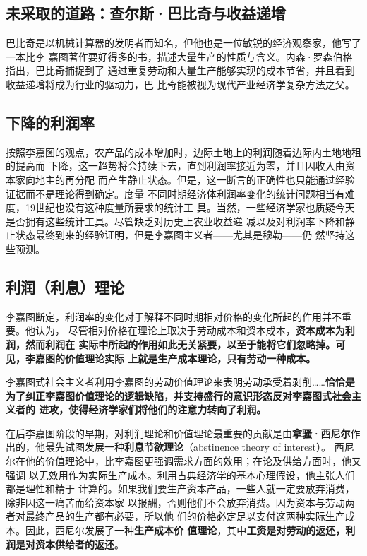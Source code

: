 \subsection{未采取的道路：查尔斯·巴比奇与收益递增}

巴比奇是以机械计算器的发明者而知名，但他也是一位敏锐的经济观察家，他写了一本比李
嘉图著作要好得多的书，描述大量生产的性质与含义。内森·罗森伯格指出，巴比奇捕捉到了
通过重复劳动和大量生产能够实现的成本节省，并且看到收益递增将成为行业的驱动力，巴
比奇能被视为现代产业经济学复杂方法之父。

\subsection{下降的利润率}

按照李嘉图的观点，农产品的成本增加时，边际土地上的利润随着边际内土地地租的提高而
下降，这一趋势将会持续下去，直到利润率接近为零，并且因收入由资本家向地主的再分配
而产生静止状态。但是，这一断言的正确性也只能通过经验证据而不是理论得到确定。度量
不同时期经济体利润率变化的统计问题相当有难度，19世纪也没有这种度量所要求的统计工
具。当然，一些经济学家也质疑今天是否拥有这些统计工具。尽管缺乏对历史上农业收益递
减以及对利润率下降和静止状态最终到来的经验证明，但是李嘉图主义者——尤其是穆勒——仍
然坚持这些预测。

\subsection{利润（利息）理论}

李嘉图断定，利润率的变化对于解释不同时期相对价格的变化所起的作用并不重要。他认为，
尽管相对价格在理论上取决于劳动成本和资本成本，\textbf{资本成本为利润，然而利润在
  实际中所起的作用如此无关紧要，以至于能将它们忽略掉。可见，李嘉图的价值理论实际
  上就是生产成本理论，只有劳动一种成本。}

李嘉图式社会主义者利用李嘉图的劳动价值理论来表明劳动承受着剥削……\textbf{恰恰是
  为了纠正李嘉图价值理论的逻辑缺陷，并支持盛行的意识形态反对李嘉图式社会主义者的
  进攻，使得经济学家们将他们的注意力转向了利润。}

在后李嘉图阶段的早期，对利润理论和价值理论最重要的贡献是由\textbf{拿骚·西尼尔}作
出的，他最先试图发展一种\textbf{利息节欲理论}（abstinence theory of interest）。
西尼尔在他的价值理论中，比李嘉图更强调需求方面的效用；在论及供给方面时，他又强调
以无效用作为实际生产成本。利用古典经济学的基本心理假设，他主张人们都是理性和精于
计算的。如果我们要生产资本产品，一些人就一定要放弃消费，除非因这一痛苦而给资本家
以报酬，否则他们不会放弃消费。因为资本与劳动两者对最终产品的生产都有必要，所以他
们的价格必定足以支付这两种实际生产成本。因此，西尼尔发展了一种\textbf{生产成本价
  值理论}，其中\textbf{工资是对劳动的返还，利润是对资本供给者的返还}。

